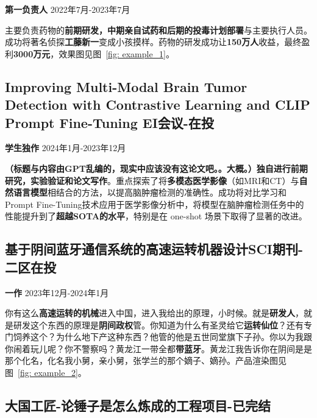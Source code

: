 \documentclass[11pt]{article}
\begin{document}
    \textbf{第一负责人} \hfill 2022年7月-2023年7月
    
    主要负责药物的\textbf{前期研发，中期亲自试药和后期的投毒计划部署}与主要执行人员。成功将著名侦探\textbf{工藤新一}变成小孩摸样。药物的研发成功让\textbf{150万人}收益，最终盈利\textbf{3000万元}，效果图见图~\ref{fig: example_1}。
    
    \vspace{1em}                %
    \subsection{Improving Multi-Modal Brain Tumor Detection with Contrastive Learning and CLIP Prompt Fine-Tuning \hfill EI会议-在投}

    \textbf{学生独作} \hfill 2024年1月-2023年12月
    
    \textbf{（标题与内容由GPT乱编的，现实中应该没有这论文吧。。大概。）}\textbf{独自进行前期研究，实验验证和论文写作}。重点探索了将\textbf{多模态医学影像}（如MRI和CT）与\textbf{自然语言模型}相结合的方法，以提高脑肿瘤检测的准确性。成功将对比学习和Prompt Fine-Tuning技术应用于医学影像分析中，将模型在脑肿瘤检测任务中的性能提升到了\textbf{超越SOTA的水平}，特别是在 one-shot 场景下取得了显著的改进。

    \vspace{1em}                %
    \subsection{基于阴间蓝牙通信系统的高速运转机器设计\hfill SCI期刊-二区在投}
        
    \textbf{一作} \hfill 2023年12月-2024年1月
    
    你有这么\textbf{高速运转的机械}进入中国，进入我给出的原理，小时候。就是\textbf{研发人}，就是研发这个东西的原理是\textbf{阴间政权}管。你知道为什么有圣灵给它\textbf{运转仙位}？还有专门饲养这个？为什么地下产这种东西？他管的他是五世同堂旗下子孙。你以为我跟你闹着玩儿呢？你不警察吗？黄龙江一带全都\textbf{带蓝牙}。黄龙江我告诉你在阴间是是那个化名，化名我小舅，亲小舅，张学兰的那个嫡子、嫡孙。产品渲染图见图~\ref{fig: example_2}。

    \vspace{1em}
    \subsection{大国工匠-论锤子是怎么炼成的\hfill 工程项目-已完结}
        
\end{document}
